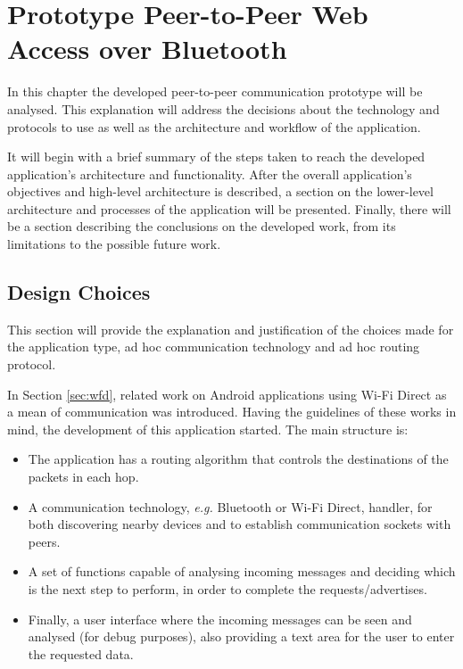 \chapter{Prototype Peer-to-Peer Web Access over Bluetooth}
\label{chapter:work}

In this chapter the developed peer-to-peer communication prototype will be analysed. This explanation will address the decisions about the technology and protocols to use as well as the architecture and workflow of the application.

It will begin with a brief summary of the steps taken to reach the developed application's architecture and functionality. After the overall application's objectives and high-level architecture is described, a section on the lower-level architecture and processes of the application will be presented. Finally, there will be a section describing the conclusions on the developed work, from its limitations to the possible future work.

\section{Design Choices}

This section will provide the explanation and justification of the choices made for the application type, ad hoc communication technology and ad hoc routing protocol.

In Section \ref{sec:wfd}, related work on Android applications using Wi-Fi Direct as a mean of communication was introduced. Having the guidelines of these works in mind, the development of this application started. The main structure is:

\begin{itemize}
	\item The application has a routing algorithm that controls the destinations of the packets in each hop.
	\item A communication technology, \textit{e.g.} Bluetooth or Wi-Fi Direct, handler, for both discovering nearby devices and to establish communication sockets with peers.
	\item A set of functions capable of analysing incoming messages and deciding which is the next step to perform, in order to complete the requests/advertises.
	\item Finally, a user interface where the incoming messages can be seen and analysed (for debug purposes), also providing a text area for the user to enter the requested data.
\end{itemize}

